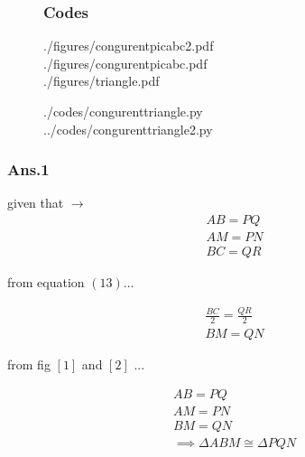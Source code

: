 \documentclass{beamer}
\begin{document}
       \begin{frame}
        \begin{figure}	
        
            	\frametitle{Codes}
        	\item[]
        	\begin{tcolorbox}[colback=blue!5,colframe=blue!40!black,title=latex codes for figures a and b ]
        		
        	  ./figures/congurentpicabc2.pdf \\	
        	  ./figures/congurentpicabc.pdf \\
        	   ./figures/triangle.pdf
        	\end{tcolorbox}
        	
        	\begin{tcolorbox}[colback=red!5,colframe=blue!40!black,title=python codes for figures a and b ]
        		./codes/congurenttriangle.py \\	
        		../codes/congurenttriangle2.py	 
        	\end{tcolorbox}
        \end{figure}
        \end{frame}
     
     
        \begin{frame}
        	\frametitle{Ans.1}
        	\begin{multicols}{2}
        	given that $\to$\\
        	
        	\begin{align}
        		AB = PQ\\
        		AM = PN\\
        		BC = QR	
        	\end{align}
        	
        	from equation $\left(13\right)$...
        	
        	\begin{align}
        		\frac{BC}{2} = \frac{QR}{2} \\
        		BM = QN
        	\end{align}
       
       		from fig $\left[1\right]$ and $\left[2\right]$ ...
       	
       		\begin{align}
       			AB = PQ\\
       			AM = PN\\
       			BM = QN\\
       			\implies  \Delta ABM \cong \Delta PQN
       		\end{align}
       		\end{multicols}
       \end{frame}
       	
\end{document}
